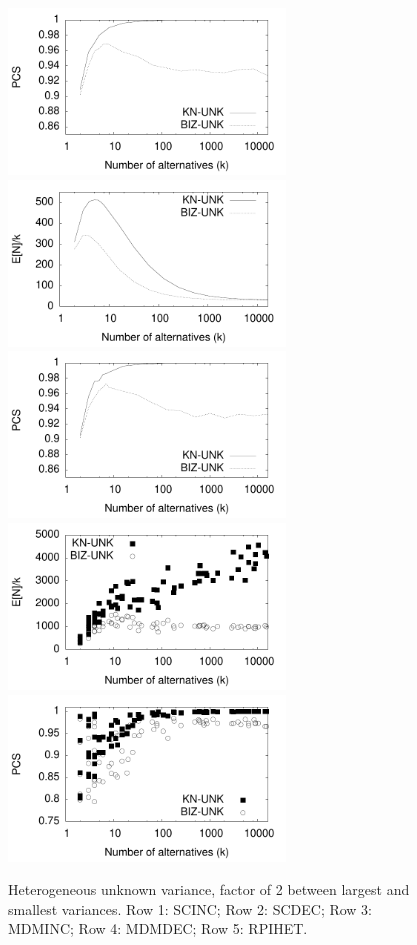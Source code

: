 \documentclass[12pt]{article}
\begin{document}
\begin{figure}[tb]
    \includegraphics[width=2.9in]{pdf/FINAL-UNK-MDMINCA-PCS}
    \includegraphics[width=2.9in]{pdf/FINAL-UNK-MDMDECA-Nk} 
    \includegraphics[width=2.9in]{pdf/FINAL-UNK-MDMDECA-PCS}
    \includegraphics[width=2.9in]{pdf/FINAL-UNK-RPIHETA-Nk} 
    \includegraphics[width=2.9in]{pdf/FINAL-UNK-RPIHETA-PCS}

    \caption{Heterogeneous unknown variance, factor of 2 between largest and smallest variances.
    Row 1: SCINC;
    Row 2: SCDEC;
    Row 3: MDMINC;
    Row 4: MDMDEC;
    Row 5: RPIHET.
    }
  \end{figure}
\end{document}
